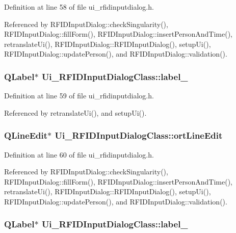 Definition at line 58 of file ui\_\-rfidinputdialog.h.

Referenced by RFIDInputDialog::checkSingularity(), RFIDInputDialog::fillForm(), RFIDInputDialog::insertPersonAndTime(), retranslateUi(), RFIDInputDialog::RFIDInputDialog(), setupUi(), RFIDInputDialog::updatePerson(), and RFIDInputDialog::validation().\hypertarget{class_ui___r_f_i_d_input_dialog_class_0b699227f3a20a7c2c4eaf330e2ba828}{
\subsubsection[label\_\-5]{\setlength{\rightskip}{0pt plus 5cm}QLabel$\ast$ {\bf Ui\_\-RFIDInputDialogClass::label\_}}}
\label{class_ui___r_f_i_d_input_dialog_class_0b699227f3a20a7c2c4eaf330e2ba828}




Definition at line 59 of file ui\_\-rfidinputdialog.h.

Referenced by retranslateUi(), and setupUi().\hypertarget{class_ui___r_f_i_d_input_dialog_class_8524d17700c18aadaf06c968611bb835}{
\subsubsection[ortLineEdit]{\setlength{\rightskip}{0pt plus 5cm}QLineEdit$\ast$ {\bf Ui\_\-RFIDInputDialogClass::ortLineEdit}}}
\label{class_ui___r_f_i_d_input_dialog_class_8524d17700c18aadaf06c968611bb835}




Definition at line 60 of file ui\_\-rfidinputdialog.h.

Referenced by RFIDInputDialog::checkSingularity(), RFIDInputDialog::fillForm(), RFIDInputDialog::insertPersonAndTime(), retranslateUi(), RFIDInputDialog::RFIDInputDialog(), setupUi(), RFIDInputDialog::updatePerson(), and RFIDInputDialog::validation().\hypertarget{class_ui___r_f_i_d_input_dialog_class_da00ac3d742ebc8b0ac85b337b1f497f}{
\subsubsection[label\_\-6]{\setlength{\rightskip}{0pt plus 5cm}QLabel$\ast$ {\bf Ui\_\-RFIDInputDialogClass::label\_}}}
\label{class_ui___r_f_i_d_input_dialog_class_da00ac3d742ebc8b0ac85b337b1f497f}




